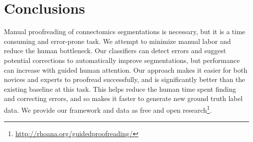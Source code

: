 \vspace{-2mm}
\section{Conclusions}


Manual proofreading of connectomics segmentations is necessary, but it is a time consuming and error-prone task. We attempt to minimize manual labor and reduce the human bottleneck. Our classifiers can detect errors and suggest potential corrections to automatically improve segmentations, but performance can increase with guided human attention. Our approach makes it easier for both novices and experts to proofread successfully, and is significantly better than the existing baseline at this task. This helps reduce the human time spent finding and correcting errors, and so makes it faster to generate new ground truth label data. We provide our framework and data as free and open research\footnote{\scriptsize{\url{http://rhoana.org/guidedproofreading/}}}.

